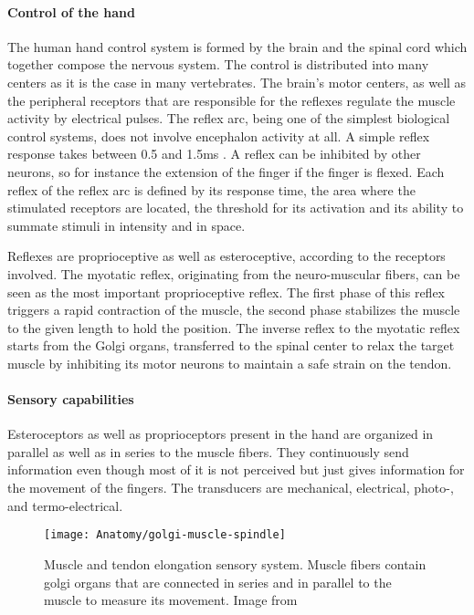 \documentclass[main]{subfiles}
\begin{document}
\paragraph{Control of the hand}
The human hand control system is formed by the brain and the spinal cord which together compose the nervous system. The control is distributed into many centers as it is the case in many vertebrates. The brain's motor centers, as well as the peripheral receptors that are responsible for the reflexes regulate the muscle activity by electrical pulses. The reflex arc, being one of the simplest biological control systems, does not involve encephalon activity at all. A simple reflex response takes between 0.5 and 1.5ms \cite{Folgheraiter2000}. A reflex can be inhibited by other neurons, so for instance the extension of the finger if the finger is flexed. Each reflex of the reflex arc is defined by its response time, the area where the stimulated receptors are located, the threshold for its activation and its ability to summate stimuli in intensity and in space.

Reflexes are proprioceptive as well as esteroceptive, according to the receptors involved. The myotatic reflex, originating from the neuro-muscular fibers, can be seen as the most important proprioceptive reflex. The first phase of this reflex triggers a rapid contraction of the muscle, the second phase stabilizes the muscle to the given length to hold the position. The inverse reflex to the myotatic reflex starts from the Golgi organs, transferred to the spinal center to relax the target muscle by inhibiting its motor neurons to maintain a safe strain on the tendon.

\paragraph{Sensory capabilities}
Esteroceptors as well as proprioceptors present in the hand are organized in parallel as well as in series to the muscle fibers. They continuously send information even though most of it is not perceived but just gives information for the movement of the fingers. The transducers are mechanical, electrical, photo-, and termo-electrical.


\begin{figure}[htp]
\centering
\texttt{[image: Anatomy/golgi-muscle-spindle]}
\caption[Muscle spindle and golgi apparatus]{Muscle and tendon elongation sensory system. Muscle fibers contain golgi organs that are connected in series and in parallel to the muscle to measure its movement. Image from \cite{Folgheraiter2000}}
\label{golgi-muscle-spindle}
\end{figure}
\end{document}
